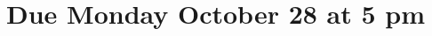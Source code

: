 \documentclass[11pt,fleqn]{article}
\begin{document}
\maketitle
\section*{Due Monday October 28 at 5 pm}










\end{document}
